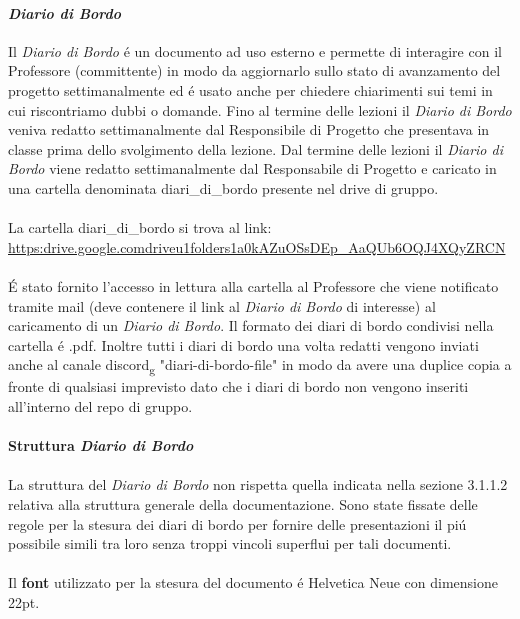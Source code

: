 \paragraph{\textit{Diario di Bordo}}
Il \textit{Diario di Bordo} é un documento ad uso esterno e permette di interagire con il Professore (committente) in modo da aggiornarlo sullo stato di avanzamento del progetto settimanalmente ed é usato 
anche per chiedere chiarimenti sui temi in cui riscontriamo dubbi o domande.
Fino al termine delle lezioni il \textit{Diario di Bordo} veniva redatto settimanalmente dal Responsibile di Progetto che presentava in classe prima dello svolgimento 
della lezione.
Dal termine delle lezioni il \textit{Diario di Bordo} viene redatto settimanalmente dal Responsabile di Progetto e caricato in una cartella denominata diari\_di\_bordo presente nel drive di gruppo.
\\\\
La cartella diari\_di\_bordo si trova al link: \href{https://drive.google.com/drive/u/1/folders/1a0kAZuOSsDEp_AaQUb6OQJ4XQyZ--RCN}{\\https:\/\/drive.google.com\/drive\/u\/1\/folders\/1a0kAZuOSsDEp\_AaQUb6OQJ4XQyZ\-\-RCN}
\\\\
É stato fornito l'accesso in lettura alla cartella al Professore che viene notificato tramite mail (deve contenere il link al \textit{Diario di Bordo} di interesse) al caricamento di un \textit{Diario di Bordo}.
Il formato dei diari di bordo condivisi nella cartella é .pdf.
Inoltre tutti i diari di bordo una volta redatti vengono inviati anche al canale discord\textsubscript{g} "diari-di-bordo-file" in modo da avere una duplice copia a fronte di 
qualsiasi imprevisto dato che i diari di bordo non vengono inseriti all'interno del repo di gruppo.
\\\\
\textbf{Struttura \textit{Diario di Bordo}} 
\\\\
La struttura del \textit{Diario di Bordo} non rispetta quella indicata nella sezione 3.1.1.2 relativa alla struttura generale della documentazione.
Sono state fissate delle regole per la stesura dei diari di bordo per fornire delle presentazioni il piú possibile simili tra loro 
senza troppi vincoli superflui per tali documenti.
\\\\
Il \textbf{font} utilizzato per la stesura del documento é Helvetica Neue con dimensione 22pt.
\\\\
